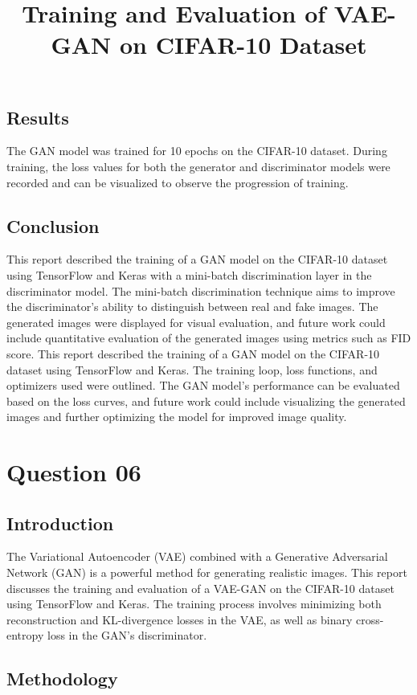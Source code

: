 \documentclass{article}
\begin{document}
\subsection{Results}
The GAN model was trained for 10 epochs on the CIFAR-10 dataset. During training, the loss values for both the generator and discriminator models were recorded and can be visualized to observe the progression of training.

\subsection{Conclusion}
This report described the training of a GAN model on the CIFAR-10 dataset using TensorFlow and Keras with a mini-batch discrimination layer in the discriminator model. The mini-batch discrimination technique aims to improve the discriminator's ability to distinguish between real and fake images. The generated images were displayed for visual evaluation, and future work could include quantitative evaluation of the generated images using metrics such as FID score. This report described the training of a GAN model on the CIFAR-10 dataset using TensorFlow and Keras. The training loop, loss functions, and optimizers used were outlined. The GAN model's performance can be evaluated based on the loss curves, and future work could include visualizing the generated images and further optimizing the model for improved image quality.








\section{Question 06}
\title{Training and Evaluation of VAE-GAN on CIFAR-10 Dataset}

\subsection{Introduction}
The Variational Autoencoder (VAE) combined with a Generative Adversarial Network (GAN) is a powerful method for generating realistic images. This report discusses the training and evaluation of a VAE-GAN on the CIFAR-10 dataset using TensorFlow and Keras. The training process involves minimizing both reconstruction and KL-divergence losses in the VAE, as well as binary cross-entropy loss in the GAN's discriminator.

\subsection{Methodology}
\end{document}
